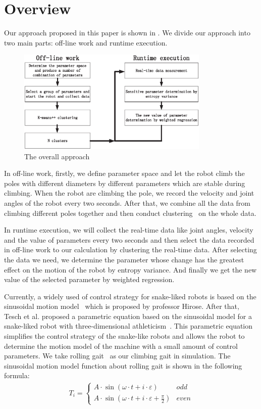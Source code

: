 \section{Overview}
Our approach proposed in this paper is shown in . We divide our approach into two main parts: off-line work and runtime execution.
\begin{figure}[H]
	\centering
	\includegraphics[width=1.0\linewidth,height=140pt]{fig/mainwork/stepMap}
	\caption{The overall approach}
\end{figure}

In off-line work, firstly, we define parameter space and let the robot climb the poles with different diameters by different parameters which are stable during climbing. When the robot are climbing the pole, we record the velocity and joint angles of the robot every two seconds. After that, we combine all the data from climbing different poles together and then conduct clustering~\cite{Cluseter_ICT,KmeansAndDeepLearning} on the whole data.

In runtime execution, we will collect the real-time data like joint angles,  velocity and the value of parameters every two seconds and then select the  data recorded in off-line work to our calculation by clustering the real-time data. After selecting the data we need, we determine the parameter whose change has the greatest effect on the motion of the robot by entropy variance. And finally we get the new value of the selected parameter by weighted regression. 

Currently, a widely used of control strategy for snake-liked robots is based on the sinusoidal motion model~\cite{HiroseSine} which is proposed by professor Hirose. After that, Tesch et al. proposed a parametric equation based on the sinusoidal model for a snake-liked robot with three-dimensional athleticism~\cite{ChosetSine}. This parametric equation simplifies the control strategy of the snake-like robots and allows the robot to determine the motion model of the machine with a small amount of control parameters. We take rolling gait~\cite{Enner2013Motion} as our climbing gait in simulation. The sinusoidal motion model function about rolling gait is shown in the following formula:
\begin{eqnarray}\label{basicRoll}
T_i=\left\{
\begin{array}{lr}
A\cdot \sin (\omega \cdot t + i\cdot \varepsilon )&odd\\
A\cdot \sin (\omega \cdot t + i\cdot \varepsilon +  \frac{\pi}{2})&even
\end{array}
\right.
\end{eqnarray}

